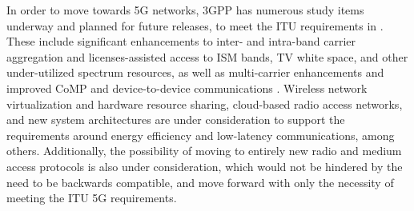 In order to move towards 5G networks, 3GPP has numerous study items underway and planned for future releases, to meet the ITU requirements in \cite{itu-2020}.  These include significant enhancements to inter- and intra-band carrier aggregation and licenses-assisted access to ISM bands, TV white space, and other under-utilized spectrum resources, as well as multi-carrier enhancements and improved CoMP and device-to-device communications \cite{lteA-gantt}.  Wireless network virtualization and hardware resource sharing, cloud-based radio access networks, and new system architectures are under consideration to support the requirements around energy efficiency and low-latency communications, among others.  Additionally, the possibility of moving to entirely new radio and medium access protocols is also under consideration, which would not be hindered by the need to be backwards compatible, and move forward with only the necessity of meeting the ITU 5G requirements. 


